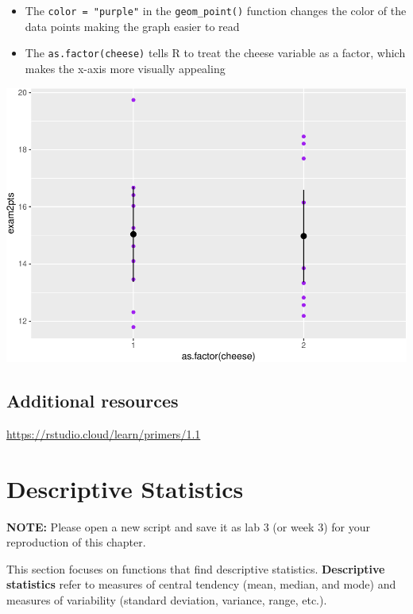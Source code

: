 \documentclass[
]{book}
\providecommand{\tightlist}{%
  \setlength{\itemsep}{0pt}\setlength{\parskip}{0pt}}
\begin{document}
\begin{itemize}
\tightlist
\item
  The \texttt{color\ =\ "purple"} in the \texttt{geom\_point()} function changes the color of the data points making the graph easier to read\\
\item
  The \texttt{as.factor(cheese)} tells R to treat the cheese variable as a factor, which makes the x-axis more visually appealing
\end{itemize}

\includegraphics{Tools-for-working-with-data-211_files/figure-latex/unnamed-chunk-4-1.pdf}

\hypertarget{additional-resources}{%
\section{Additional resources}\label{additional-resources}}

\url{https://rstudio.cloud/learn/primers/1.1}

\hypertarget{descriptive-statistics}{%
\chapter{Descriptive Statistics}\label{descriptive-statistics}}

\textbf{NOTE:} Please open a new script and save it as lab 3 (or week 3) for your reproduction of this chapter.

This section focuses on functions that find descriptive statistics. \textbf{Descriptive statistics} refer to measures of central tendency (mean, median, and mode) and measures of variability (standard deviation, variance, range, etc.).
\end{document}

